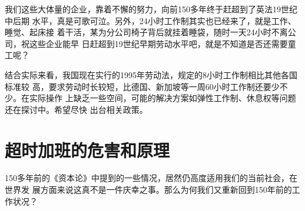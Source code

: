 我们这些大体量的企业，靠着不懈的努力，向前150多年终于赶超到了英法19世纪中后期
水平，真是可歌可泣。另外，24小时工作制其实也已经来了，就是工作、睡觉、起床接
着干活，某为分公司椅子背后就挂着睡袋，随时一天24小时不离公司，祝这些企业能早
日赶超到19世纪早期劳动水平吧，就是不知道是否还需要童工呢？

结合实际来看，我国现在实行的1995年劳动法，规定的8小时工作制相比其他各国标准较
高，要求劳动时长较短，比德国、新加坡等一周60小时工作制还要少不少。在实际操作
上缺乏一些空间，可能的解决方案如弹性工作制、休息权等问题还在探讨中。希望尽快
出台相关政策。

\section{超时加班的危害和原理}
\label{sec:gzryuanli}

150多年前的《资本论》中提到的一些情况，居然仍高度适用我们的当前社会，在世界发
展方面来说这真不是一件庆幸之事。那么为何我们又重新回到150年前的工作状况？

